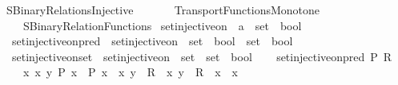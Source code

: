 %
\begin{isabellebody}%
%
%
\isadelimdocument
%
\endisadelimdocument
%
\isatagdocument
%
\isamarkuptrue%
%
\endisatagdocument
{\isafolddocument}%
%
\isadelimdocument
%
\endisadelimdocument
%
\isadelimtheory
%
\endisadelimtheory
%
\isatagtheory
{}\isamarkupfalse%
\ SBinary{\isacharunderscore}{\kern0pt}Relations{\isacharunderscore}{\kern0pt}Injective\isanewline
\ \ \isanewline
\ \ \ \ Transport{\isachardot}{\kern0pt}Functions{\isacharunderscore}{\kern0pt}Monotone\isanewline
\ \ \ \ SBinary{\isacharunderscore}{\kern0pt}Relation{\isacharunderscore}{\kern0pt}Functions\isanewline
{}%
\endisatagtheory
{\isafoldtheory}%
%
\isadelimtheory
\isanewline
%
\endisadelimtheory
\isanewline
{}\isamarkupfalse%
\ set{\isacharunderscore}{\kern0pt}injective{\isacharunderscore}{\kern0pt}on\ {\isacharcolon}{\kern0pt}{\isacharcolon}{\kern0pt}\ {\isachardoublequoteopen}{\isacharprime}{\kern0pt}a\ {\isasymRightarrow}\ set\ {\isasymRightarrow}\ bool{\isachardoublequoteclose}\isanewline
\isanewline
{}\isamarkupfalse%
\isanewline
\ \ set{\isacharunderscore}{\kern0pt}injective{\isacharunderscore}{\kern0pt}on{\isacharunderscore}{\kern0pt}pred\ {\isasymequiv}\ {\isachardoublequoteopen}set{\isacharunderscore}{\kern0pt}injective{\isacharunderscore}{\kern0pt}on\ {\isacharcolon}{\kern0pt}{\isacharcolon}{\kern0pt}\ {\isacharparenleft}{\kern0pt}set\ {\isasymRightarrow}\ bool{\isacharparenright}{\kern0pt}\ {\isasymRightarrow}\ set\ {\isasymRightarrow}\ bool{\isachardoublequoteclose}\isanewline
\ \ set{\isacharunderscore}{\kern0pt}injective{\isacharunderscore}{\kern0pt}on{\isacharunderscore}{\kern0pt}set\ {\isasymequiv}\ {\isachardoublequoteopen}set{\isacharunderscore}{\kern0pt}injective{\isacharunderscore}{\kern0pt}on\ {\isacharcolon}{\kern0pt}{\isacharcolon}{\kern0pt}\ set\ {\isasymRightarrow}\ set\ {\isasymRightarrow}\ bool{\isachardoublequoteclose}\isanewline
{}\isanewline
\ \ \isamarkupfalse%
\ {\isachardoublequoteopen}set{\isacharunderscore}{\kern0pt}injective{\isacharunderscore}{\kern0pt}on{\isacharunderscore}{\kern0pt}pred\ P\ R\ {\isasymequiv}\isanewline
\ \ \ \ {\isasymforall}x\ x{\isacharprime}{\kern0pt}\ y{\isachardot}{\kern0pt}\ P\ x\ {\isasymand}\ P\ x{\isacharprime}{\kern0pt}\ {\isasymand}\ {\isasymlangle}x{\isacharcomma}{\kern0pt}\ y{\isasymrangle}\ {\isasymin}\ R\ {\isasymand}\ {\isasymlangle}x{\isacharprime}{\kern0pt}{\isacharcomma}{\kern0pt}\ y{\isasymrangle}\ {\isasymin}\ R\ {\isasymlongrightarrow}\ x\ {\isacharequal}{\kern0pt}\ x{\isacharprime}{\kern0pt}{\isachardoublequoteclose}\isanewline

\end{isabellebody}
